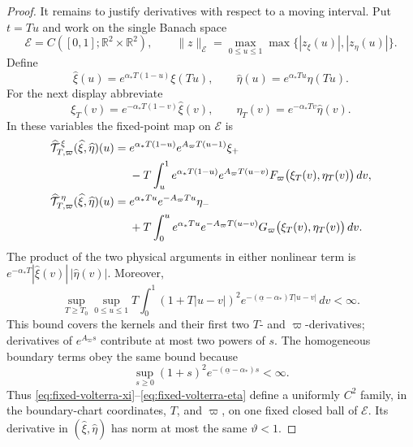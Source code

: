 \documentclass[11pt]{amsart}
\numberwithin{equation}{section}
\theoremstyle{definition}
\theoremstyle{remark}
\newcommand{\R}{\mathbb R}
\begin{document}
\begin{proof}
It remains to justify derivatives with respect to a moving interval.  Put
$t=Tu$ and work on the single Banach space
\begin{equation}\label{eq:volterra-norm}
 \mathcal E=C([0,1];\R^2\times\R^2),\qquad
 \|z\|_{\mathcal E}=\max_{0\le u\le1}
       \max\{|z_\xi(u)|,|z_\eta(u)|\}.
\end{equation}
Define
\begin{equation}\label{eq:fixed-domain-variables}
 \widehat\xi(u)=e^{\alpha_*T(1-u)}\xi(Tu),\qquad
 \widehat\eta(u)=e^{\alpha_*Tu}\eta(Tu).
\end{equation}
For the next display abbreviate
\[
 \xi_T(v)=e^{-\alpha_*T(1-v)}\widehat\xi(v),\qquad
 \eta_T(v)=e^{-\alpha_*Tv}\widehat\eta(v).
\]
In these variables the fixed-point map on $\mathcal E$ is
\begin{align}
 \widehat{\mathcal T}^{\,\xi}_{T,\varpi}(\widehat\xi,\widehat\eta)(u)
 ={}&e^{\alpha_*T(1-u)}e^{A_\varpi T(u-1)}\xi_+\notag\\
 &-T\int_u^1e^{\alpha_*T(1-u)}e^{A_\varpi T(u-v)}
 F_\varpi\bigl(\xi_T(v),\eta_T(v)\bigr)\,dv,
 \label{eq:fixed-volterra-xi}\\
 \widehat{\mathcal T}^{\,\eta}_{T,\varpi}(\widehat\xi,\widehat\eta)(u)
 ={}&e^{\alpha_*Tu}e^{-A_\varpi Tu}\eta_-\notag\\
 &+T\int_0^ue^{\alpha_*Tu}e^{-A_\varpi T(u-v)}
 G_\varpi\bigl(\xi_T(v),\eta_T(v)\bigr)\,dv.
 \label{eq:fixed-volterra-eta}
\end{align}
The product of the two physical arguments in either nonlinear term is
$e^{-\alpha_*T}|\widehat\xi(v)|\,|\widehat\eta(v)|$.  Moreover,
\begin{equation}\label{eq:fixed-kernel-bound}
 \sup_{T\ge T_0}\sup_{0\le u\le1}
 T\int_0^1(1+T|u-v|)^2
 e^{-(\underline\alpha-\alpha_*)T|u-v|}\,dv<\infty.
\end{equation}
This bound covers the kernels and their first two $T$- and
$\varpi$-derivatives; derivatives of $e^{A_\varpi s}$ contribute at most
two powers of $s$.  The homogeneous boundary terms obey the same bound
because
\[
 \sup_{s\ge0}(1+s)^2
 e^{-(\underline\alpha-\alpha_*)s}<\infty.
\]
Thus \eqref{eq:fixed-volterra-xi}--\eqref{eq:fixed-volterra-eta} define a
uniformly $C^2$ family, in the boundary-chart coordinates, $T$, and
$\varpi$, on one fixed closed ball of $\mathcal E$.  Its derivative in
$(\widehat\xi,\widehat\eta)$ has norm at most the same
$\vartheta<1$.


\end{proof}
\end{document}
